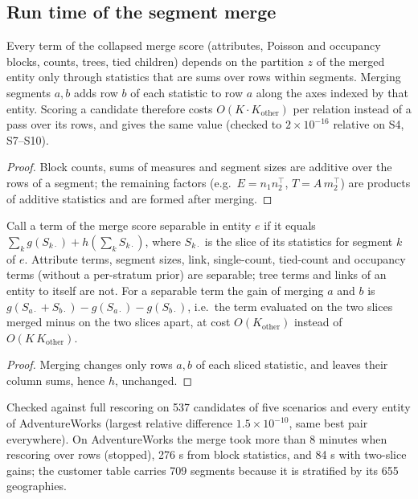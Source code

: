 \subsection{Run time of the segment merge}
\begin{proposition}\label{prop:mergestats}
Every term of the collapsed merge score (attributes, Poisson and occupancy blocks, counts, trees, tied children) depends on the partition $z$ of the merged entity only through statistics that are sums over rows within segments. Merging segments $a,b$ adds row $b$ of each statistic to row $a$ along the axes indexed by that entity. Scoring a candidate therefore costs $O(K\cdot K_{\mathrm{other}})$ per relation instead of a pass over its rows, and gives the same value (checked to $2\times10^{-16}$ relative on S4, S7--S10).
\end{proposition}
\begin{proof}
Block counts, sums of measures and segment sizes are additive over the rows of a segment; the remaining factors (e.g.\ $E=n_1n_2^\top$, $T=A\,m_2^\top$) are products of additive statistics and are formed after merging.
\end{proof}
\begin{proposition}\label{prop:mergegain}
Call a term of the merge score separable in entity $e$ if it equals $\sum_k g(S_{k\cdot})+h(\sum_k S_{k\cdot})$, where $S_{k\cdot}$ is the slice of its statistics for segment $k$ of $e$. Attribute terms, segment sizes, link, single-count, tied-count and occupancy terms (without a per-stratum prior) are separable; tree terms and links of an entity to itself are not. For a separable term the gain of merging $a$ and $b$ is $g(S_{a\cdot}+S_{b\cdot})-g(S_{a\cdot})-g(S_{b\cdot})$, i.e.\ the term evaluated on the two slices merged minus on the two slices apart, at cost $O(K_{\mathrm{other}})$ instead of $O(K\,K_{\mathrm{other}})$.
\end{proposition}
\begin{proof}
Merging changes only rows $a,b$ of each sliced statistic, and leaves their column sums, hence $h$, unchanged.
\end{proof}
\noindent Checked against full rescoring on 537 candidates of five scenarios and every entity of AdventureWorks (largest relative difference $1.5\times10^{-10}$, same best pair everywhere). On AdventureWorks the merge took more than 8 minutes when rescoring over rows (stopped), 276 s from block statistics, and 84 s with two-slice gains; the customer table carries 709 segments because it is stratified by its 655 geographies.

